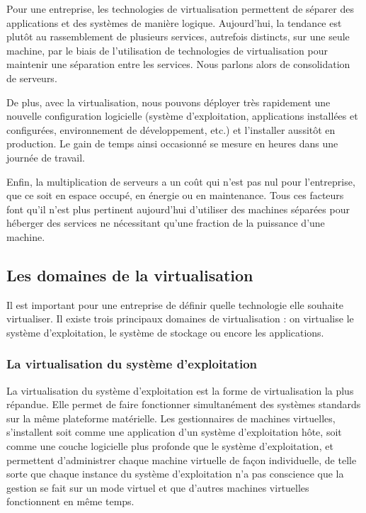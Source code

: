 \documentclass[a4paper,12pt]{report}
\begin{document}
\begin{onehalfspace}
	Pour une entreprise, les technologies de virtualisation permettent de séparer des applications et des systèmes de manière logique. Aujourd'hui, la tendance est plutôt au rassemblement de plusieurs services, autrefois distincts, sur une seule machine, par le biais de l’utilisation de technologies de virtualisation pour maintenir une séparation entre les services. Nous parlons alors de consolidation de serveurs.
	
	De plus, avec la virtualisation, nous pouvons déployer très rapidement une nouvelle configuration logicielle (système d’exploitation, applications installées et configurées, environnement de développement, etc.) et l’installer aussitôt en production. Le gain de temps ainsi occasionné se mesure en heures dans une journée de travail. 
	
	Enfin, la multiplication de serveurs a un coût qui n’est pas nul pour l’entreprise, que ce soit en espace occupé, en énergie ou en maintenance. Tous ces facteurs font qu’il n’est plus pertinent aujourd’hui d’utiliser des machines séparées pour héberger des services ne nécessitant qu’une 
fraction de la puissance d’une machine.
	
	\subsection{Les domaines de la virtualisation}
	Il est important pour une entreprise de définir quelle technologie elle souhaite virtualiser. Il existe trois principaux domaines de virtualisation : on virtualise le système d'exploitation, le système de stockage ou encore les applications.
	
	\subsubsection{La virtualisation du système d'exploitation}
	La virtualisation du système d'exploitation est la forme de virtualisation la plus répandue. Elle permet de faire fonctionner simultanément des systèmes standards sur la même plateforme matérielle. Les gestionnaires de machines virtuelles, s'installent soit comme une application d'un système d'exploitation hôte, soit comme une couche logicielle plus profonde que le système d'exploitation, et permettent d'administrer chaque machine virtuelle de façon individuelle, de telle sorte que chaque instance du système d'exploitation n'a pas conscience que la gestion se fait sur un mode virtuel et que d'autres machines virtuelles fonctionnent en même temps.
	

\end{onehalfspace}
\end{document}
